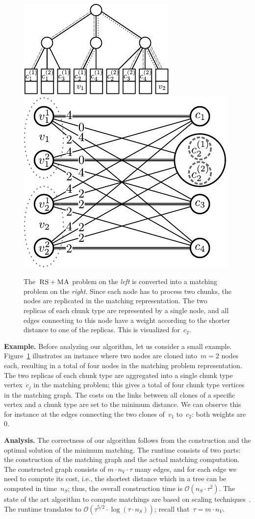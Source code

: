 \documentclass[preprint,12pt]{elsarticle}
\newcommand{\MaFactor}{m}
\newcommand{\ChunkType}{\tau}
\newcommand{\VirtualNode}{v}
\newcommand{\achunk}{\ensuremath{c}}
\newcommand{\RS}{\textsc{RS}}
\newcommand{\MA}{\textsc{MA}}
\begin{document}
\begin{figure}
\includegraphics[width = 0.49\columnwidth]{figs/model_ma_r_cv_boxes}
\hfill
\includegraphics[width =0.49\columnwidth]{figs/matching}
\caption{The~$\RS+\MA$ problem on the \emph{left} is converted into a
matching problem on the \emph{right}. Since each node has to process two
chunks, the
nodes are replicated in the matching representation. The two replicas of each
chunk type are represented by a single node, and all edges connecting to this
node have a weight according to the shorter distance to one of the replicas.
This is visualized for~$\achunk_2$.}
\label{fig:matching}
\end{figure}

\textbf{Example.} Before analyzing our algorithm, let us consider a small example.
Figure~\ref{fig:matching} illustrates
an instance where two nodes are
cloned into~$\MaFactor = 2$ nodes each,
resulting in a total of four nodes in
the matching problem representation.
The two replicas of each chunk type are
aggregated into a single chunk type vertex~$\achunk_j$  in the matching problem;
this gives a total of four chunk type vertices in the matching graph. The costs
on the links between all clones of a specific vertex and a chunk type are set to
the minimum distance. We can observe this for instance at the edges connecting
the two clones of~$\VirtualNode_1$ to~$\achunk_2$: both weights are 0.

\textbf{Analysis.}
The correctness of our algorithm follows from the construction and the optimal
solution of the minimum matching.
The runtime consists of two parts: the construction of the matching graph and
the actual matching computation. The constructed graph consists of
$\MaFactor \cdot n_V \cdot \ChunkType$
many edges,
and for each edge we need to compute its cost, i.e., the shortest distance
which in a tree can be computed in time~$n_S$; thus, the overall construction time
is
$\mathcal{O}(n_S \cdot \tau^2)$.
The state of the art algorithm to compute matchings are based on scaling techniques~\cite{scale-match}.
The runtime translates to
$\mathcal{O}(\tau^{5/2}\cdot \log(\tau\cdot n_S))$; recall that~$\tau = \MaFactor\cdot n_V$.
\end{document}
